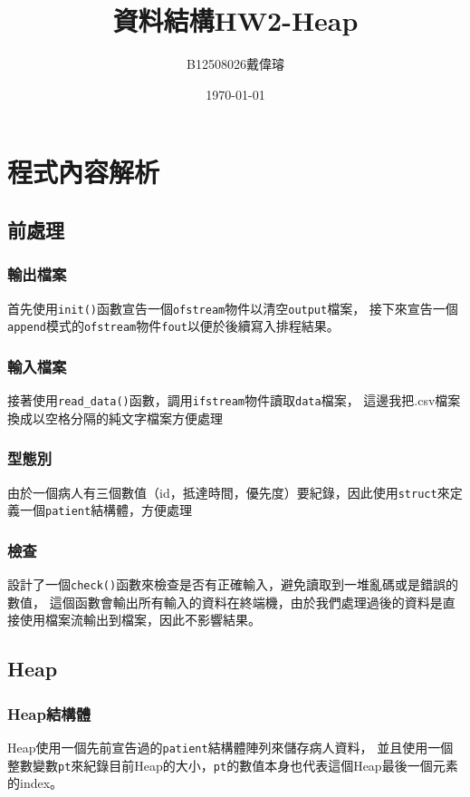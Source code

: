 \documentclass[12pt,a4paper]{article}
\title{資料結構HW2-Heap}
\author{B12508026戴偉璿}
\date{\today}
\begin{document}
\maketitle


\newpage

\section{程式內容解析}
\subsection{前處理}

\subsubsection{輸出檔案}
首先使用\texttt{init()}函數宣告一個\texttt{ofstream}物件以清空\texttt{output}檔案，
接下來宣告一個\texttt{append}模式的\texttt{ofstream}物件\texttt{fout}以便於後續寫入排程結果。

\subsubsection{輸入檔案}
接著使用\texttt{read\_data()}函數，調用\texttt{ifstream}物件讀取\texttt{data}檔案，
這邊我把.csv檔案換成以空格分隔的純文字檔案方便處理

\subsubsection{型態別}
由於一個病人有三個數值（id，抵達時間，優先度）要紀錄，因此使用\texttt{struct}來定義一個\texttt{patient}結構體，方便處理

\subsubsection{檢查}
設計了一個\texttt{check()}函數來檢查是否有正確輸入，避免讀取到一堆亂碼或是錯誤的數值，
這個函數會輸出所有輸入的資料在終端機，由於我們處理過後的資料是直接使用檔案流輸出到檔案，因此不影響結果。

\subsection{Heap}
\subsubsection{Heap結構體}
Heap使用一個先前宣告過的\texttt{patient}結構體陣列來儲存病人資料，
並且使用一個整數變數\texttt{pt}來紀錄目前Heap的大小，\texttt{pt}的數值本身也代表這個Heap最後一個元素的index。
\end{document}
